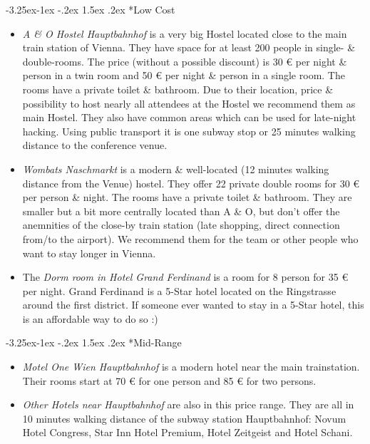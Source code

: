 \documentclass[10pt,a4paper]{article}
\makeatletter
\renewcommand\subsection{%
\@startsection{subsection}{2}{\z@}%
              {-3.25ex\@plus -1ex \@minus -.2ex}%
              {1.5ex \@plus .2ex}%
              {\color{kdelight}\sffamily\Large\bfseries}}
\makeatother
\begin{document}
\subsection*{Low Cost}
\begin{itemize}
\item \emph{A \& O Hostel Hauptbahnhof} is a very big Hostel located close to the main train station of Vienna. They have space for at least 200 people in single- \& double-rooms. The price (without a possible discount) is 30 \euro{} per night \& person in a twin room and 50 \euro{} per night \& person in a single room. The rooms have a private toilet \& bathroom. Due to their location, price \& possibility to host nearly all attendees at the Hostel we recommend them as main Hostel. They also have common areas which can be used for late-night hacking. Using public transport it is one subway stop or 25 minutes walking distance to the conference venue.
\item \emph{Wombats Naschmarkt} is a modern \& well-located (12 minutes walking distance from the Venue) hostel. They offer 22 private double rooms for 30 \euro{} per person \& night. The rooms have a private toilet \& bathroom. They are smaller but a bit more centrally located than A \& O, but don't offer the anemnities of the close-by train station (late shopping, direct connection from/to the airport). We recommend them for the team or other people who want to stay longer in Vienna.
\item The \emph{Dorm room in Hotel Grand Ferdinand}  is a room for 8 person for 35 \euro{} per night. Grand Ferdinand is a 5-Star hotel located on the Ringstrasse around the first district. If someone ever wanted to stay in a 5-Star hotel, this is an affordable way to do so :)
\end{itemize}

\subsection*{Mid-Range}
\begin{itemize}
\item \emph{Motel One Wien Hauptbahnhof} is a modern hotel near the main trainstation. Their rooms start at 70 \euro{} for one person and 85 \euro{} for two persons.
\item \emph{Other Hotels near Hauptbahnhof} are also in this price range. They are all in 10 minutes walking distance of the subway station Hauptbahnhof: Novum Hotel Congress, Star Inn Hotel Premium, Hotel Zeitgeist and Hotel Schani.
\end{itemize}
\end{document}
